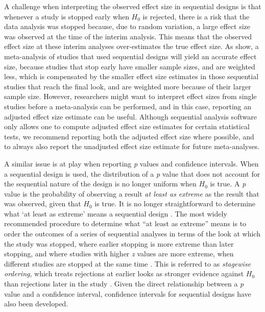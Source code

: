 \documentclass[
  oneside]{krantz}
\begin{document}
A challenge when interpreting the observed effect size in sequential designs is that whenever a study is stopped early when \(H_0\) is rejected, there is a risk that the data analysis was stopped because, due to random variation, a large effect size was observed at the time of the interim analysis. This means that the observed effect size at these interim analyses over-estimates the true effect size. As \citet{schonbrodt_sequential_2017} show, a meta-analysis of studies that used sequential designs will yield an accurate effect size, because studies that stop early have smaller sample sizes, and are weighted less, which is compensated by the smaller effect size estimates in those sequential studies that reach the final look, and are weighted more because of their larger sample size. However, researchers might want to interpret effect sizes from single studies before a meta-analysis can be performed, and in this case, reporting an adjusted effect size estimate can be useful. Although sequential analysis software only allows one to compute adjusted effect size estimates for certain statistical tests, we recommend reporting both the adjusted effect size where possible, and to always also report the unadjusted effect size estimate for future meta-analyses.

A similar issue is at play when reporting \emph{p} values and confidence intervals. When a sequential design is used, the distribution of a \emph{p} value that does not account for the sequential nature of the design is no longer uniform when \(H_0\) is true. A \emph{p} value is the probability of observing a result \emph{at least as extreme} as the result that was observed, given that \(H_0\) is true. It is no longer straightforward to determine what `at least as extreme' means a sequential design \citep{cook_p-value_2002}. The most widely recommended procedure to determine what ``at least as extreme'' means is to order the outcomes of a series of sequential analyses in terms of the look at which the study was stopped, where earlier stopping is more extreme than later stopping, and where studies with higher \emph{z} values are more extreme, when different studies are stopped at the same time \citep{proschan_statistical_2006}. This is referred to as \emph{stagewise ordering}, which treats rejections at earlier looks as stronger evidence against \(H_0\) than rejections later in the study \citep{wassmer_group_2016}. Given the direct relationship between a \emph{p} value and a confidence interval, confidence intervals for sequential designs have also been developed.
\end{document}

